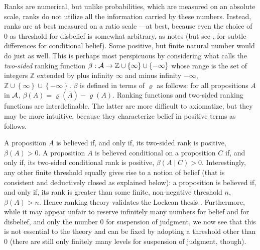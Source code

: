 Ranks are numerical, but unlike probabilities, which are measured on an absolute scale, ranks do not utilize all the information carried by these numbers. Instead, ranks are at best measured on a ratio scale \citep{hs08}---at best, because even the choice of $0$ as threshold for disbelief is somewhat arbitrary, as \citet[9]{s15} notes (but see \citealp{r18}, for subtle differences for conditional belief). Some positive, but finite natural number would do just as well. This is perhaps most perspicuous by considering what \citet{s12} calls the \emph{two-sided} ranking function $\beta:\begin{cal}A\end{cal}\rightarrow\mathbb{Z}\cup\left\{\infty\right\}\cup\left\{-\infty\right\}$ whose range is the set of integers $\mathbb{Z}$ extended by plus infinity $\infty$ and minus infinity $-\infty$, $\mathbb{Z}\cup\left\{\infty\right\}\cup\left\{-\infty\right\}$. $\beta$ is defined in terms of $\varrho$ as follows: for all propositions $A$ in $\cal A$, $\beta\left(A\right)=\varrho\left(\overline{A}\right)-\varrho\left(A\right)$. Ranking functions and two-sided ranking functions are interdefinable. The latter are more difficult to axiomatize, but they may be more intuitive, because they characterize belief in positive terms as follows.

A proposition $A$ is believed if, and only if, its two-sided rank is positive, $\beta\left(A\right)>0$. A proposition $A$ is believed conditional on a proposition $C$ if, and only if, its two-sided conditional rank is positive, $\beta\left(A\mid C\right)>0$. Interestingly, any other finite threshold equally gives rise to a notion of belief (that is consistent and deductively closed as explained below): a proposition is believed if, and only if, its rank is greater than some finite, non-negative threshold $n$, $\beta\left(A\right)>n$. Hence ranking theory validates the Lockean thesis \citep{f09, h09a}. Furthermore, while it may appear unfair to reserve infinitely many numbers for belief and for disbelief, and only the number $0$ for suspension of judgment, we now see that this is not essential to the theory and can be fixed by adopting a threshold other than $0$ (there are still only finitely many levels for suspension of judgment, though).

